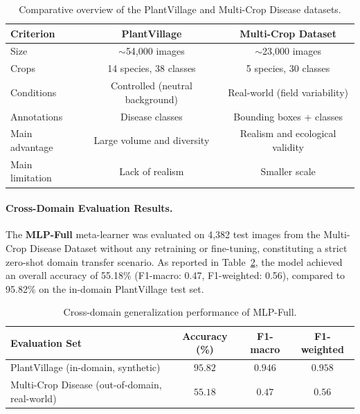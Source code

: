 \documentclass[pdflatex,sn-basic]{sn-jnl}
\begin{document}
\begin{table}[h]
\centering
\caption{Comparative overview of the PlantVillage and Multi-Crop Disease datasets.}
\label{tab:compar_dataset}
\begin{tabular}{|l|c|c|}
\hline
\textbf{Criterion} & \textbf{PlantVillage} & \textbf{Multi-Crop Dataset} \\ \hline
Size & $\sim$54,000 images & $\sim$23,000 images \\ \hline
Crops & 14 species, 38 classes & 5 species, 30 classes \\ \hline
Conditions & Controlled (neutral background) & Real-world (field variability) \\ \hline
Annotations & Disease classes & Bounding boxes + classes \\ \hline
Main advantage & Large volume and diversity & Realism and ecological validity \\ \hline
Main limitation & Lack of realism & Smaller scale \\ \hline
\end{tabular}
\end{table}

\paragraph{Cross-Domain Evaluation Results.}
The \textbf{MLP-Full} meta-learner was evaluated on 4,382 test images from the Multi-Crop Disease Dataset without any retraining or fine-tuning, constituting a strict zero-shot domain transfer scenario. As reported in Table~\ref{tab:cross_domain}, the model achieved an overall accuracy of 55.18\% (F1-macro: 0.47, F1-weighted: 0.56), compared to 95.82\% on the in-domain PlantVillage test set.

\begin{table}[htbp]
\centering
\caption{Cross-domain generalization performance of MLP-Full.}
\label{tab:cross_domain}
\begin{tabular*}{\textwidth}{@{\extracolsep\fill}lccc@{}}
\toprule
\textbf{Evaluation Set} & \textbf{Accuracy (\%)} & \textbf{F1-macro} & \textbf{F1-weighted} \\
\midrule
PlantVillage (in-domain, synthetic) & $\mathbf{95.82}$ & $\mathbf{0.946}$ & $\mathbf{0.958}$ \\
Multi-Crop Disease (out-of-domain, real-world) & $55.18$ & $0.47$ & $0.56$ \\
\bottomrule
\end{tabular*}
\end{table}
\end{document}
